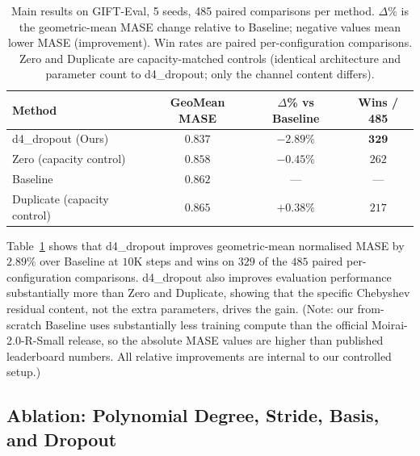 \documentclass[11pt]{article}
\theoremstyle{plain}
\theoremstyle{definition}
\theoremstyle{remark}
\newcommand{\HD}{\textsf{d4\_dropout}}
\newcommand{\Baseline}{\textsf{Baseline}}
\newcommand{\Zero}{\textsf{Zero}}
\newcommand{\Dup}{\textsf{Duplicate}}
\begin{document}
\begin{table}[h]
\centering
\caption{Main results on GIFT-Eval, 5 seeds, 485 paired comparisons per method. $\Delta\%$ is the geometric-mean MASE change relative to \Baseline{}; negative values mean lower MASE (improvement). Win rates are paired per-configuration comparisons. \Zero{} and \Dup{} are capacity-matched controls (identical architecture and parameter count to \HD{}; only the channel content differs).}
\label{tab:main}
\begin{tabular}{lccc}
\toprule
\textbf{Method} & \textbf{GeoMean MASE} & \textbf{$\Delta$\% vs \Baseline{}} & \textbf{Wins / 485} \\
\midrule
\HD{} (Ours) & $\mathbf{0.837}$ & $\mathbf{-2.89\%}$ & $\mathbf{329}$ \\
\Zero{} (capacity control) & $0.858$ & $-0.45\%$ & $262$ \\
\Baseline{} & $0.862$ & --- & --- \\
\Dup{} (capacity control) & $0.865$ & $+0.38\%$ & $217$ \\
\bottomrule
\end{tabular}
\end{table}

Table~\ref{tab:main} shows that \HD{} improves geometric-mean normalised MASE by $2.89\%$ over \Baseline{} at $10$K steps and wins on $329$ of the $485$ paired per-configuration comparisons. \HD{} also improves evaluation performance substantially more than \Zero{} and \Dup{}, showing that the specific Chebyshev residual content, not the extra parameters, drives the gain. (Note: our from-scratch \Baseline{} uses substantially less training compute than the official Moirai-2.0-R-Small release, so the absolute MASE values are higher than published leaderboard numbers. All relative improvements are internal to our controlled setup.)

\subsection{Ablation: Polynomial Degree, Stride, Basis, and Dropout}
\end{document}

